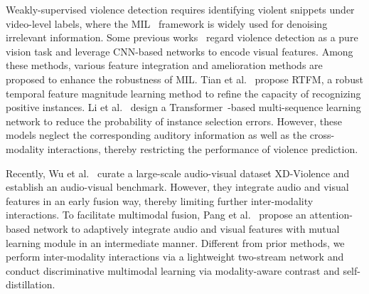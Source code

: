 \documentclass[sigconf]{acmart}
\begin{document}
Weakly-supervised violence detection requires identifying violent snippets under video-level labels, where the MIL~\cite{maron1997framework} framework is widely used for denoising irrelevant information. Some previous works~\cite{bermejo2011violence, deniz2014fast, zhang2019temporal, peixoto2019toward, zhang2016new, khan2019cover, wu2021learning, ristea2021self, feng2021mist} regard violence detection as a pure vision task and leverage CNN-based networks to encode visual features. Among these methods, various feature integration and amelioration methods are proposed to enhance the robustness of MIL. Tian et al.~\cite{tian2021weakly} propose RTFM, a robust temporal feature magnitude learning method to refine the capacity of recognizing positive instances. Li et al.~\cite{li2022self} design a Transformer~\cite{vaswani2017attention}-based multi-sequence learning network to reduce the probability of instance selection errors. However, these models neglect the corresponding auditory information as well as the cross-modality interactions, thereby restricting the performance of violence prediction.

Recently, Wu et al.~\cite{wu2020not} curate a large-scale audio-visual dataset XD-Violence and establish an audio-visual benchmark. However, they integrate audio and visual features in an early fusion way, thereby limiting further inter-modality interactions. To facilitate multimodal fusion, Pang et al.~\cite{pang2021violence} propose an attention-based network to adaptively integrate audio and visual features with mutual learning module in an intermediate manner. Different from prior methods, we perform inter-modality interactions via a lightweight two-stream network and conduct discriminative multimodal learning via modality-aware contrast and self-distillation.
\end{document}
